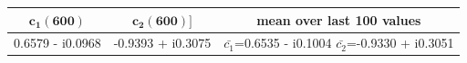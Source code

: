 \documentclass[a4paper,11pt,openright,twoside]{report}
\begin{document}
\begin{center}
	\begin{table}[h]
		\centering
		\begin{tabular}{c|c|c}
			\toprule
			$\mathbf{c_1(600)}$ & $\mathbf{c_2(600)]}$ & \textbf{mean over last 100 values} \\
			\midrule
			0.6579 - i0.0968 & -0.9393 + i0.3075 & $\bar{c_1}$=0.6535 - i0.1004 \quad $\bar{c_2}$=-0.9330 + i0.3051\\
			\bottomrule		
		\end{tabular}
	\end{table}
\end{center}
\end{document}
